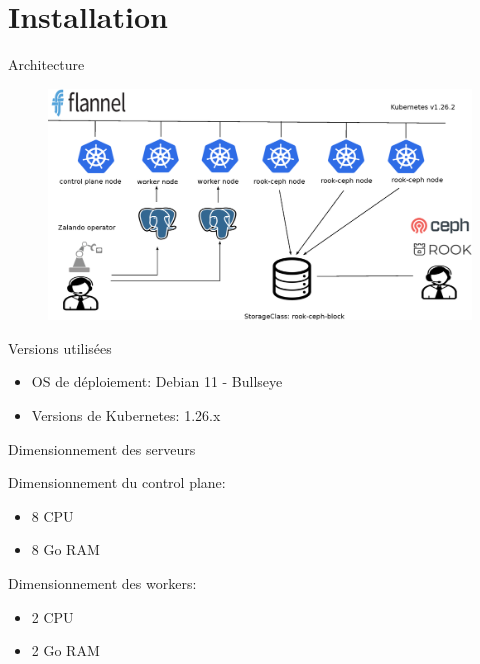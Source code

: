 \section{Installation}


\begin{frame}[fragile]{Architecture}

\begin{figure}
\begin{center}
\includegraphics[scale=0.5]{images/architecture.eps}
\end{center}
\end{figure}

\end{frame}


\begin{frame}[fragile]{Versions utilisées}

   \begin{itemize}
      \item OS de déploiement: Debian 11 - Bullseye
      \item Versions de Kubernetes: 1.26.x
   \end{itemize}

\end{frame}


\begin{frame}[fragile]{Dimensionnement des serveurs}

   Dimensionnement du control plane:

   \begin{itemize}
      \item 8 CPU
      \item 8 Go RAM
   \end{itemize}

   Dimensionnement des workers:

   \begin{itemize}
      \item 2 CPU
      \item 2 Go RAM
   \end{itemize}

\end{frame}

